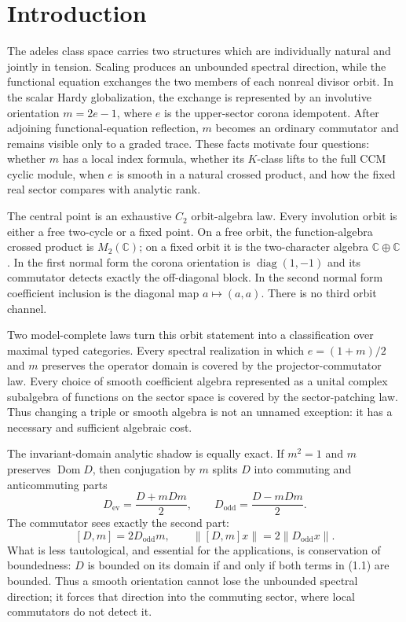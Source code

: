 \documentclass[11pt,reqno]{amsart}
\newcommand{\C}{\mathbb C}
\newcommand{\Dom}{\operatorname{Dom}}
\begin{document}
\section{Introduction}

The adeles class space carries two structures which are individually natural and jointly
in tension.  Scaling produces an unbounded spectral direction, while the functional equation
exchanges the two members of each nonreal divisor orbit.  In the scalar Hardy globalization, the
exchange is represented by an involutive orientation $m=2e-1$, where $e$ is the upper-sector
corona idempotent.  After adjoining functional-equation reflection, $m$ becomes an ordinary
commutator and remains visible only to a graded trace.  These facts motivate four questions:
whether $m$ has a local index formula, whether its $K$-class lifts to the full CCM cyclic module,
when $e$ is smooth in a natural crossed product, and how the fixed real sector compares with
analytic rank.

The central point is an exhaustive $C_2$ orbit-algebra law.  Every involution orbit is either a
free two-cycle or a fixed point.  On a free orbit, the function-algebra crossed product is
$M_2(\C)$; on a fixed orbit it is the two-character algebra $\C\oplus\C$.  In the first normal
form the corona orientation is $\operatorname{diag}(1,-1)$ and its commutator detects exactly the
off-diagonal block.  In the second normal form coefficient inclusion is the diagonal map
$a\mapsto(a,a)$.  There is no third orbit channel.

Two model-complete laws turn this orbit statement into a classification over maximal typed
categories.  Every spectral realization in which $e=(1+m)/2$ and $m$ preserves the operator
domain is covered by the projector-commutator law.  Every choice of smooth coefficient algebra
represented as a unital complex subalgebra of functions on the sector space is covered by the
sector-patching law.  Thus changing a triple or smooth algebra is not an unnamed exception: it
has a necessary and sufficient algebraic cost.

The invariant-domain analytic shadow is equally exact.  If $m^2=1$ and $m$ preserves $\Dom D$,
then conjugation by $m$ splits $D$ into commuting and anticommuting parts
\[
 D_{\mathrm{ev}}=\frac{D+mDm}{2},\qquad
 D_{\mathrm{odd}}=\frac{D-mDm}{2}.                 \tag{1.1}
\]
The commutator sees exactly the second part:
\[
 [D,m]=2D_{\mathrm{odd}}m,\qquad
 \|[D,m]x\|=2\|D_{\mathrm{odd}}x\|.                \tag{1.2}
\]
What is less tautological, and essential for the applications, is conservation of boundedness:
$D$ is bounded on its domain if and only if both terms in (1.1) are bounded.  Thus a smooth
orientation cannot lose the unbounded spectral direction; it forces that direction into the
commuting sector, where local commutators do not detect it.
\end{document}
